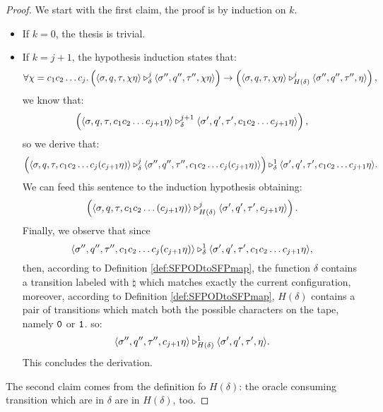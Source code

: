 \begin{proof}
  We start with the first claim, the proof is by induction on $k$.
  \begin{itemize}
    \item If $k=0$, the thesis is trivial.
    \item If $k=j+1$, the hypothesis induction states that:
    $$
    \forall \chi =c_1c_2\ldots c_j.
\left(\langle \sigma, q, \tau, \chi\eta\rangle \triangleright^{j}_{\delta} \langle \sigma'', q'', \tau'', \chi\eta\rangle \right)\to
\left(\langle \sigma, q, \tau, \chi\eta\rangle \triangleright^{j}_{H(\delta)} \langle \sigma'', q'', \tau'', \eta\rangle\right),
    $$
    we know that:
    $$
    \left(\langle \sigma, q, \tau, c_1c_2\ldots c_{j+1}\eta\rangle \triangleright^{j+1}_{\delta} \langle \sigma', q', \tau', c_1c_2\ldots c_{j+1}\eta\rangle \right),
    $$
    so we derive that:
    $$
    \left(\langle \sigma, q, \tau, c_1c_2\ldots c_j(c_{j+1}\eta)\rangle \triangleright^{j}_{\delta} \langle \sigma'', q'', \tau'', c_1c_2\ldots c_j(c_{j+1}\eta)\rangle \right)\triangleright^{1}_{\delta} \langle\sigma', q', \tau', c_1c_2\ldots c_{j+1}\eta\rangle.
    $$
    We can feed this sentence to the induction hypothesis obtaining:
    $$
    \left(\langle \sigma, q, \tau, c_1c_2\ldots (c_{j+1}\eta)\rangle \triangleright^{j}_{H(\delta)} \langle \sigma', q', \tau', c_{j+1}\eta\rangle\right).
    $$
    Finally, we observe that since
    $$
    \langle \sigma'', q'', \tau'', c_1c_2\ldots c_j(c_{j+1}\eta)\rangle \triangleright^{1}_{\delta}\langle \sigma', q', \tau', c_1c_2\ldots c_{j+1}\eta\rangle,
    $$
    then, according to Definition \ref{def:SFPODtoSFPmap}, the function $\delta$
    contains a transition labeled with $\natural$  which matches exactly the
    current configuration, moreover, according to Definition \ref{def:SFPODtoSFPmap},
    $H(\delta)$ contains a pair of transitions which match both the possible
    characters on the tape, namely $\mathtt{0}$ or $\mathtt{1}$.
    so:
    $$
    \langle \sigma'', q'', \tau'', c_{j+1}\eta\rangle \triangleright^{1}_{H(\delta)}\langle \sigma', q', \tau',\eta\rangle.
    $$
    This concludes the derivation.
  \end{itemize}
  The second claim comes from the definition fo $H(\delta)$: the oracle consuming
  transition which are in $\delta$ are in $H(\delta)$, too.
\end{proof}
